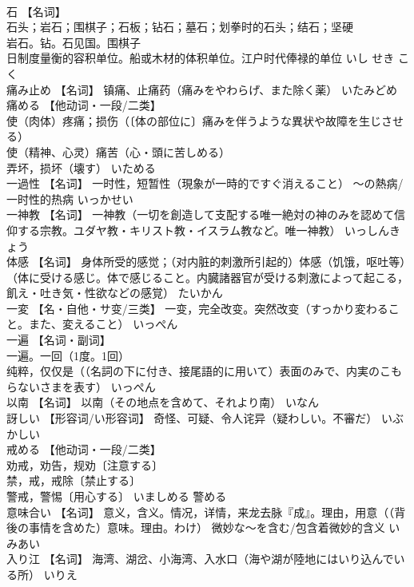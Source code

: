 \documentclass[8pt]{extreport}
\begin{document}
\begin{CJK}{UTF8}{min}
\\	石	【名词】 
\\	石头；岩石；围棋子；石板；钻石；墓石；划拳时的石头；结石；坚硬 
\\	岩石。钻。石见国。围棋子 
\\	日制度量衡的容积单位。船或木材的体积单位。江户时代俸禄的单位	いし せき こく	
\\	痛み止め	【名词】 镇痛、止痛药（痛みをやわらげ、また除く薬）	いたみどめ	
\\	痛める	【他动词・一段/二类】 
\\	使（肉体）疼痛；损伤（〔体の部位に〕痛みを伴うような異状や故障を生じさせる） 
\\	使（精神、心灵）痛苦（心・頭に苦しめる） 
\\	弄坏，损坏（壊す）	いためる	
\\	一過性	【名词】 一时性，短暂性（現象が一時的ですぐ消えること） ～の熱病/一时性的热病	いっかせい	
\\	一神教	【名词】 一神教（一切を創造して支配する唯一絶対の神のみを認めて信仰する宗教。ユダヤ教・キリスト教・イスラム教など。唯一神教）	いっしんきょう	
\\	体感	【名词】 身体所受的感觉；（对内脏的刺激所引起的）体感（饥饿，呕吐等）（体に受ける感じ。体で感じること。内臓諸器官が受ける刺激によって起こる，飢え・吐き気・性欲などの感覚）	たいかん	
\\	一変	【名・自他・サ变/三类】 一变，完全改变。突然改变（すっかり変わること。また、変えること）	いっぺん	
\\	一遍	【名词・副词】 
\\	一遍。一回（1度。1回） 
\\	纯粹，仅仅是（（名詞の下に付き、接尾語的に用いて）表面のみで、内実のこもらないさまを表す）	いっぺん	
\\	以南	【名词】 以南（その地点を含めて、それより南）	いなん	
\\	訝しい	【形容词/い形容词】 奇怪、可疑、令人诧异（疑わしい。不審だ）	いぶかしい	
\\	戒める	【他动词・一段/二类】 
\\	劝戒，劝告，规劝〔注意する〕 
\\	禁，戒，戒除〔禁止する〕 
\\	警戒，警惕〔用心する〕	いましめる	警める
\\	意味合い	【名词】 意义，含义。情况，详情，来龙去脉『成』。理由，用意（（背後の事情を含めた）意味。理由。わけ） 微妙な～を含む/包含着微妙的含义	いみあい	
\\	入り江	【名词】 海湾、湖岔、小海湾、入水口（海や湖が陸地にはいり込んでいる所）	いりえ	

\end{CJK}
\end{document}
